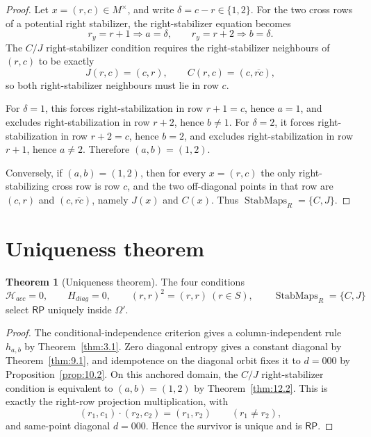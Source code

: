 \documentclass[11pt]{article}
\theoremstyle{definition}
\newtheorem{theorem}{Theorem}[section]
\newcommand{\RP}{\mathsf{RP}}
\begin{document}
\begin{proof}
Let \(x=(r,c)\in M^\times\), and write \(\delta=c-r\in\{1,2\}\).  For the two
cross rows of a potential right stabilizer, the right-stabilizer equation becomes
\[
r_y=r+1\Rightarrow a=\delta,
\qquad
r_y=r+2\Rightarrow b=\delta.
\]
The \(C/J\) right-stabilizer condition requires the right-stabilizer neighbours of \((r,c)\) to be
exactly
\[
J(r,c)=(c,r),
\qquad
C(r,c)=(c,\overline{rc}),
\]
so both right-stabilizer neighbours must lie in row \(c\).

For \(\delta=1\), this forces right-stabilization in row \(r+1=c\), hence \(a=1\), and
excludes right-stabilization in row \(r+2\), hence \(b\ne1\).  For \(\delta=2\), it
forces right-stabilization in row \(r+2=c\), hence \(b=2\), and excludes right-stabilization in
row \(r+1\), hence \(a\ne2\).  Therefore \((a,b)=(1,2)\).

Conversely, if \((a,b)=(1,2)\), then for every \(x=(r,c)\) the only right-stabilizing
cross row is row \(c\), and the two off-diagonal points in that row are
\((c,r)\) and \((c,\overline{rc})\), namely \(J(x)\) and \(C(x)\).  Thus
\(\operatorname{StabMaps}_{R}=\{C,J\}\).
\end{proof}

\section{Uniqueness theorem}\label{uniqueness-theorem}\label{compact-uniqueness-core}

\begin{theorem}[Uniqueness theorem]
\label{thm:12.3}
The four conditions
\[
\mathcal H_{acc}=0,
\qquad
H_{diag}=0,
\qquad
(r,r)^2=(r,r)\ (r\in S),
\qquad
\operatorname{StabMaps}_{R}=\{C,J\}
\]
select \(\RP\) uniquely inside \(\Omega'\).
\end{theorem}

\begin{proof}
The conditional-independence criterion gives a column-independent rule \(h_{a,b}\) by
Theorem~\ref{thm:3.1}.  Zero diagonal entropy gives a constant diagonal by
Theorem~\ref{thm:9.1}, and idempotence on the diagonal orbit fixes it to \(d=000\) by
Proposition~\ref{prop:10.2}.  On this anchored domain, the \(C/J\) right-stabilizer condition is equivalent to \((a,b)=(1,2)\) by Theorem~\ref{thm:12.2}.  This is
exactly the right-row projection multiplication, with
\[
(r_1,c_1)\cdot(r_2,c_2)=(r_1,r_2)
\qquad(r_1\ne r_2),
\]
and same-point diagonal \(d=000\).  Hence the survivor is unique and is
\(\RP\).
\end{proof}
\end{document}
